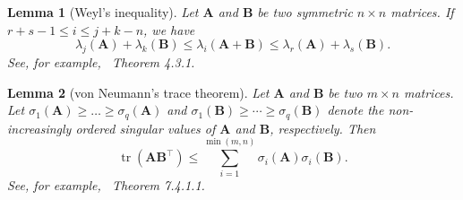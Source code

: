 \documentclass[10pt]{book}
\newtheorem{lemma}{Lemma}
\theoremstyle{definition}
\DeclareMathOperator{\mytr}{tr}
\newcommand{\bA}{\mathbf{A}}
\newcommand{\bB}{\mathbf{B}}
\begin{document}
    \begin{lemma}[Weyl's inequality]
        Let $\bA$ and $\bB$ be two symmetric $n\times n$ matrices. If $r+s-1\leq i \leq j+k-n$, we have
        $$
        \lambda_j(\bA) +\lambda_k(\bB)\leq \lambda_i (\bA+\bB) \leq
        \lambda_r(\bA)+\lambda_s(\bB).
        $$
        See, for example,~\citet{Horn1985Matrix} Theorem 4.3.1.
\end{lemma}
\begin{lemma}[von Neumann's trace theorem]
    Let $\bA$ and $\bB$ be two $m\times n$ matrices. Let $\sigma_1(\bA)\geq \ldots \geq \sigma_q (\bA)$ and $\sigma_1(\bB)\geq \cdots \geq \sigma_q (\bB)$ denote the non-increasingly ordered singular values of $\bA$ and $\bB$, respectively. Then
    \begin{equation*}
        \mytr(\bA \bB^\top)\leq \sum_{i=1}^{\min(m,n)}\sigma_i(\bA)\sigma_i(\bB).
    \end{equation*}
    See, for example,~\citet{Horn1985Matrix} Theorem 7.4.1.1.
\end{lemma}
\end{document}

